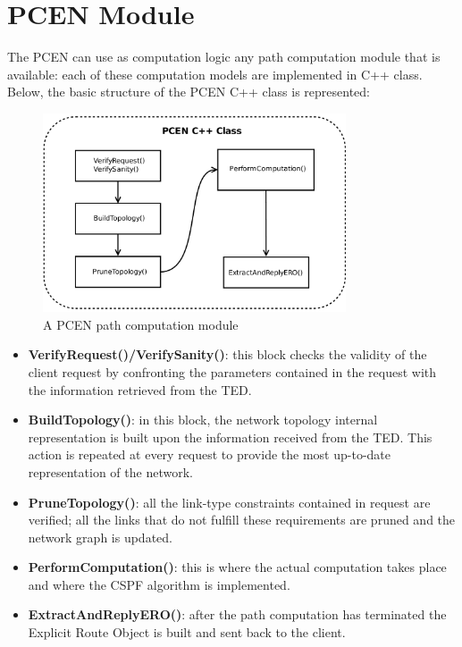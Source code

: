 \documentclass[10pt,a4paper]{report}
\begin{document}
\section{PCEN Module}

The PCEN can use as computation logic any path computation module that
is available: each of these computation models are implemented in C++
class. Below, the basic structure of the PCEN C++ class is
represented:

\begin{figure}[!htbp]
  \begin{center}
    \includegraphics[width=0.8\textwidth]{img/pcen_module}
    \caption[PCEN computation module]{A PCEN path computation module}
    \label{fig:pcen_module}
  \end{center}
\end{figure}

\begin{itemize}
\item \textbf{VerifyRequest()/VerifySanity()}: this block checks the validity
  of the client request by confronting the parameters contained in the
  request with the information retrieved from the TED.
\item \textbf{BuildTopology()}: in this block, the network topology
  internal representation is built upon the information received from
  the TED. This action is repeated at every request to provide the
  most up-to-date representation of the network.
\item \textbf{PruneTopology()}: all the link-type constraints
  contained in request are verified; all the links that do not fulfill
  these requirements are pruned and the network graph is updated.
\item \textbf{PerformComputation()}: this is where the actual
  computation takes place and where the CSPF algorithm is implemented.
\item \textbf{ExtractAndReplyERO()}: after the path computation has
  terminated the Explicit Route Object is built and sent back to the
  client.
\end{itemize}
\end{document}
